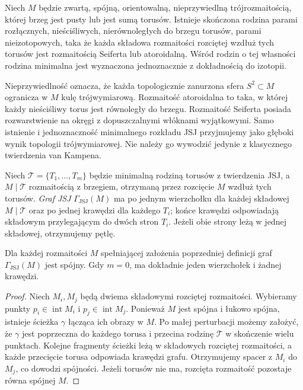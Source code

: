 \begin{twierdzenie}
\label{thm:tg-jsj-theorem}
Niech $M$ będzie zwartą, spójną, orientowalną,
nieprzywiedlną trójrozmaitością, której brzeg jest
pusty lub jest sumą torusów. Istnieje skończona
rodzina parami rozłącznych, nieściśliwych,
nierównoległych do brzegu torusów, parami
nieizotopowych, taka że każda składowa rozmaitości
rozciętej wzdłuż tych torusów jest rozmaitością
Seiferta lub atoroidalną. Wśród rodzin o tej
własności rodzina minimalna jest wyznaczona
jednoznacznie z dokładnością do izotopii.
\end{twierdzenie}

\begin{uwaga}
Nieprzywiedlność oznacza, że każda topologicznie zanurzona
sfera $S^2\subset M$ ogranicza w $M$ kulę trójwymiarową. Rozmaitość atoroidalna
to taka, w której każdy nieściśliwy torus jest
równoległy do brzegu. Rozmaitość Seiferta posiada
rozwarstwienie na okręgi z dopuszczalnymi włóknami
wyjątkowymi. Samo istnienie i jednoznaczność
minimalnego rozkładu JSJ przyjmujemy jako głęboki
wynik topologii trójwymiarowej. Nie należy go
wywodzić jedynie z klasycznego twierdzenia
van Kampena.
\end{uwaga}

\begin{definicja}
Niech $\mathcal T=\{T_1,\ldots,T_m\}$ będzie
minimalną rodziną torusów z twierdzenia JSJ,
a $M\mid\mathcal T$ rozmaitością z brzegiem,
otrzymaną przez rozcięcie $M$ wzdłuż tych torusów.
\emph{Graf JSJ} $\Gamma_{\mathrm{JSJ}}(M)$ ma po jednym
wierzchołku dla każdej składowej $M\mid\mathcal T$
oraz po jednej krawędzi dla każdego $T_i$;
końce krawędzi odpowiadają składowym przylegającym
do dwóch stron $T_i$. Jeżeli obie strony leżą
w jednej składowej, otrzymujemy pętlę.
\end{definicja}

\begin{stwierdzenie}
Dla każdej rozmaitości $M$ spełniającej założenia
poprzedniej definicji graf $\Gamma_{\mathrm{JSJ}}(M)$
jest spójny. Gdy $m=0$, ma dokładnie jeden
wierzchołek i żadnej krawędzi.
\end{stwierdzenie}
\begin{proof}
Niech $M_i,M_j$ będą dwiema składowymi rozciętej
rozmaitości. Wybieramy punkty $p_i\in\operatorname{int}M_i$
i $p_j\in\operatorname{int}M_j$. Ponieważ $M$ jest
spójna i łukowo spójna, istnieje ścieżka $\gamma$
łącząca ich obrazy w $M$. Po małej perturbacji
możemy założyć, że $\gamma$ jest poprzeczna do
każdego torusa i przecina rodzinę $\mathcal T$
w skończenie wielu punktach. Kolejne fragmenty
ścieżki leżą w składowych rozciętej rozmaitości,
a każde przecięcie torusa odpowiada krawędzi grafu.
Otrzymujemy spacer z $M_i$ do $M_j$, co dowodzi
spójności. Jeżeli torusów nie ma, rozcięta
rozmaitość pozostaje równa spójnej $M$.
\end{proof}


